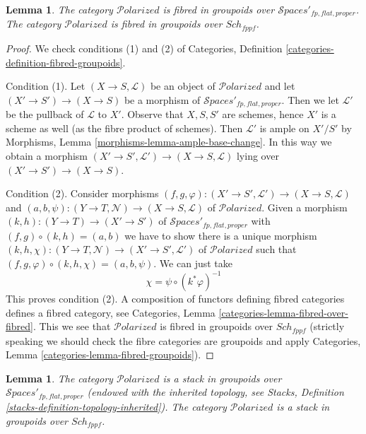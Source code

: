 \documentclass{stacks-project}
\theoremstyle{plain}
\newtheorem{lemma}[subsection]{Lemma}
\theoremstyle{definition}
\theoremstyle{remark}
\numberwithin{equation}{subsection}
\def\Sch{\mathit{Sch}}
\def\Spacesstack{\mathcal{S}\!\mathit{paces}}
\def\Polarizedstack{\mathcal{P}\!\mathit{olarized}}
\begin{document}
\begin{lemma}
\label{lemma-polarized-fibred-in-groupoids}
The category $\Polarizedstack$ is fibred in groupoids over
$\Spacesstack'_{fp, flat, proper}$.
The category $\Polarizedstack$ is fibred in groupoids over $\Sch_{fppf}$.
\end{lemma}

\begin{proof}
We check conditions (1) and (2) of
Categories, Definition \ref{categories-definition-fibred-groupoids}.

\medskip\noindent
Condition (1). Let $(X \to S, \mathcal{L})$ be an object of
$\Polarizedstack$ and let $(X' \to S') \to (X \to S)$
be a morphism of $\Spacesstack'_{fp, flat, proper}$. Then we
let $\mathcal{L}'$ be the pullback of $\mathcal{L}$ to $X'$.
Observe that $X, S, S'$ are schemes, hence $X'$ is a scheme
as well (as the fibre product of schemes). Then
$\mathcal{L}'$ is ample on $X'/S'$ by
Morphisms, Lemma \ref{morphisms-lemma-ample-base-change}.
In this way we obtain a morphism
$(X' \to S', \mathcal{L}') \to (X \to S, \mathcal{L})$
lying over $(X' \to S') \to (X \to S)$.

\medskip\noindent
Condition (2). Consider morphisms
$(f, g, \varphi) : (X' \to S', \mathcal{L}') \to (X \to S, \mathcal{L})$ and
$(a, b, \psi) : (Y \to T, \mathcal{N}) \to (X \to S, \mathcal{L})$
of $\Polarizedstack$. Given a morphism $(k, h) : (Y \to T) \to (X' \to S')$
of $\Spacesstack'_{fp, flat, proper}$
with $(f, g) \circ (k, h) = (a, b)$ we have to show
there is a unique morphism
$(k, h, \chi) : (Y \to T, \mathcal{N}) \to (X' \to S', \mathcal{L}')$
of $\Polarizedstack$ such that
$(f, g, \varphi) \circ (k, h, \chi) = (a, b, \psi)$.
We can just take
$$
\chi = \psi \circ (k^*\varphi)^{-1}
$$
This proves condition (2). A composition of functors defining
fibred categories defines a fibred category, see
Categories, Lemma \ref{categories-lemma-fibred-over-fibred}.
This we see that $\Polarizedstack$ is fibred in groupoids over
$\Sch_{fppf}$ (strictly speaking we should check the fibre
categories are groupoids and apply
Categories, Lemma \ref{categories-lemma-fibred-groupoids}).
\end{proof}

\begin{lemma}
\label{lemma-polarized-stack}
The category $\Polarizedstack$ is a stack in groupoids over
$\Spacesstack'_{fp, flat, proper}$ (endowed with the inherited topology,
see Stacks, Definition \ref{stacks-definition-topology-inherited}).
The category $\Polarizedstack$ is a stack in groupoids over $\Sch_{fppf}$.
\end{lemma}
\end{document}
